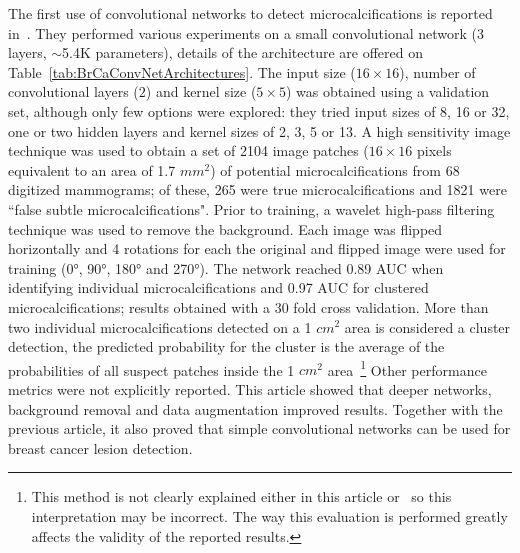 The first use of convolutional networks to detect microcalcifications is reported in~\cite{Lo1995}. They performed various experiments on a small convolutional network (3 layers, $\sim$5.4K parameters), details of the architecture are offered on Table~\ref{tab:BrCaConvNetArchitectures}. The input size ($16\times 16$), number of convolutional layers ($2$) and kernel size ($5\times5$) was obtained using a validation set, although only few options were explored: they tried input sizes of 8, 16 or 32, one or two hidden layers and kernel sizes of 2, 3, 5 or 13.
A high sensitivity image technique was used to obtain a set of 2104 image patches ($16 \times 16$ pixels equivalent to an area of 1.7 $mm^2$) of potential microcalcifications from 68 digitized mammograms; of these, 265 were true microcalcifications and 1821 were ``false subtle microcalcifications". Prior to training, a wavelet high-pass filtering technique was used to remove the background. Each image was flipped horizontally and 4 rotations for each the original and flipped image were used for training (0°, 90°, 180° and 270°).
The network reached 0.89 AUC when identifying individual microcalcifications and 0.97 AUC for clustered microcalcifications; results obtained with a 30 fold cross validation. More than two individual microcalcifications detected on a 1 $cm^2$ area is considered a cluster detection, the predicted probability for the cluster is the average of the probabilities of all suspect patches inside the 1 $cm^2$ area~\footnote{This method is not clearly explained either in this article or~\cite{Lo1998} so this interpretation may be incorrect. The way this evaluation is performed greatly affects the validity of the reported results.} Other performance metrics were not explicitly reported.
This article showed that deeper networks, background removal and data augmentation improved results. Together with the previous article, it also proved that simple convolutional networks can be used for breast cancer lesion detection. 

